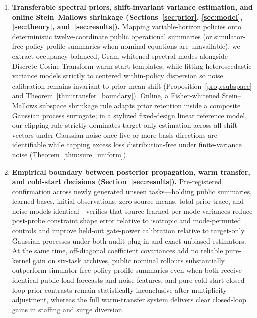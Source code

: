 \begin{enumerate}
  \item \textbf{Transferable spectral priors, shift-invariant variance estimation, and online Stein--Mallows shrinkage (Sections~\ref{sec:prior}, \ref{sec:model}, \ref{sec:theory}, and~\ref{sec:results}).} Mapping variable-horizon policies onto deterministic twelve-coordinate public operational summaries (or simulator-free policy-profile summaries when nominal equations are unavailable), we extract occupancy-balanced, Gram-whitened spectral modes alongside Discrete Cosine Transform warm-start templates, while fitting heteroscedastic variance models strictly to centered within-policy dispersion so noise calibration remains invariant to prior mean shift (Proposition~\ref{prop:subspace} and Theorem~\ref{thm:transfer_boundary}). Online, a Fisher-whitened Stein--Mallows subspace shrinkage rule adapts prior retention inside a composite Gaussian process surrogate; in a stylized fixed-design linear reference model, our clipping rule strictly dominates target-only estimation across all shift vectors under Gaussian noise once five or more basis directions are identifiable while capping excess loss distribution-free under finite-variance noise (Theorem~\ref{thm:sure_uniform}).
  \item \textbf{Empirical boundary between posterior propagation, warm transfer, and cold-start decisions (Section~\ref{sec:results}).} Pre-registered confirmation across newly generated unseen tasks—holding public summaries, learned bases, initial observations, zero source means, total prior trace, and noise models identical—verifies that source-learned per-mode variances reduce post-probe constraint shape error relative to isotropic and mode-permuted controls and improve held-out gate-power calibration relative to target-only Gaussian processes under both audit-plug-in and exact unbiased estimators. At the same time, off-diagonal coefficient covariances add no reliable pure-kernel gain on six-task archives, public nominal rollouts substantially outperform simulator-free policy-profile summaries even when both receive identical public load forecasts and noise features, and pure cold-start closed-loop prior contrasts remain statistically inconclusive after multiplicity adjustment, whereas the full warm-transfer system delivers clear closed-loop gains in staffing and surge diversion.
\end{enumerate}
